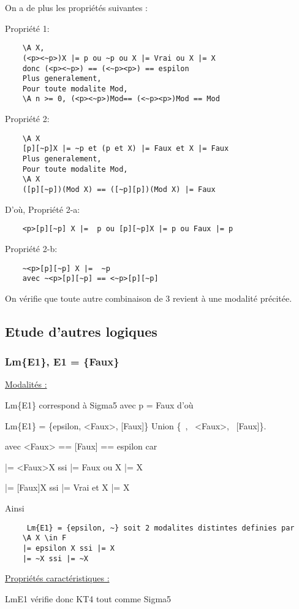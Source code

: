 \documentclass[a4paper,10pt]{article}
\begin{document}
On a de plus les propriétés suivantes :
	
Propriété 1:
	\begin{lstlisting}
	\A X,
	(<p><~p>)X |= p ou ~p ou X |= Vrai ou X |= X 
	donc (<p><~p>) == (<~p><p>) == espilon
	Plus generalement,
	Pour toute modalite Mod, 
	\A n >= 0, (<p><~p>)Mod== (<~p><p>)Mod == Mod
\end{lstlisting}
Propriété 2:
	\begin{lstlisting}
	\A X
	[p][~p]X |= ~p et (p et X) |= Faux et X |= Faux	
	Plus generalement,
	Pour toute modalite Mod, 
	\A X
	([p][~p])(Mod X) == ([~p][p])(Mod X) |= Faux 
\end{lstlisting}
D'où, 
Propriété 2-a:
	\begin{lstlisting}
	<p>[p][~p] X |=  p ou [p][~p]X |= p ou Faux |= p
	\end{lstlisting}
	Propriété 2-b:
	\begin{lstlisting}
	~<p>[p][~p] X |=  ~p  
	avec ~<p>[p][~p] == <~p>[p][~p]
\end{lstlisting}
On vérifie que toute autre combinaison de 3 revient à une modalité précitée.
  
  \subsection{Etude d'autres logiques}
  
   \subsubsection{Lm\{E1\}, E1 = \{Faux\}}
   
	\underline{Modalités :}
	
Lm\{E1\} correspond à Sigma5 avec p = Faux d'où

Lm\{E1\} = \{epsilon, <Faux>, [Faux]\} Union \{~, ~<Faux>, ~[Faux]\}.

avec <Faux> == [Faux] == espilon car

	|= <Faux>X ssi |= Faux ou X |= X

	|= [Faux]X ssi |= Vrai et X |= X
	
Ainsi
\begin{lstlisting}
	 Lm{E1} = {epsilon, ~} soit 2 modalites distintes definies par 
	\A X \in F
	|= epsilon X ssi |= X
	|= ~X ssi |= ~X
\end{lstlisting}
	
	\underline{Propriétés caractéristiques :}
	
Lm{E1} vérifie donc KT4 tout comme Sigma5
\end{document}
